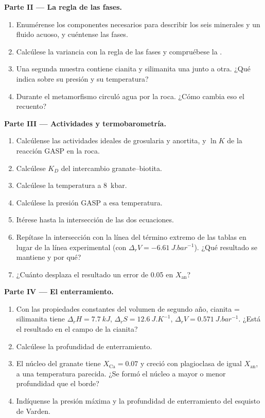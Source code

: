 \begin{problem}
\medskip\noindent\textbf{Parte II --- La regla de las fases.}
\begin{enumerate}[resume]
  \item Enumérense los componentes necesarios para describir los seis minerales y un
        fluido acuoso, y cuéntense las fases.
  \item Calcúlese la variancia con la regla de las fases y compruébese la
        .
  \item Una segunda muestra contiene cianita y silimanita una junto a otra. ¿Qué
        indica sobre su presión y su temperatura?
  \item Durante el metamorfismo circuló agua por la roca. ¿Cómo cambia eso
        el recuento?
\end{enumerate}

\medskip\noindent\textbf{Parte III --- Actividades y termobarometría.}
\begin{enumerate}[resume]
  \item Calcúlense las actividades ideales de grosularia y anortita, y $\ln K$
        de la reacción GASP en la roca.
  \item Calcúlese $K_D$ del intercambio granate--biotita.
  \item Calcúlese la temperatura a \qty{8}{kbar}.
  \item Calcúlese la presión GASP a esa temperatura.
  \item Itérese hasta la intersección de las dos ecuaciones.
  \item Repítase la intersección con la línea del término extremo de las tablas en lugar
        de la línea experimental (con $\Delta_rV = \qty{-6.61}{J.bar^{-1}}$).
        ¿Qué resultado se mantiene y por qué?
  \item ¿Cuánto desplaza el resultado un error de 0.05 en
        $X_{\text{an}}$?
\end{enumerate}

\medskip\noindent\textbf{Parte IV --- El enterramiento.}
\begin{enumerate}[resume]
  \item Con las propiedades constantes del volumen de segundo año, cianita =
        silimanita tiene $\Delta_rH = \qty{7.7}{kJ}$, $\Delta_rS =
        \qty{12.6}{J.K^{-1}}$, $\Delta_rV = \qty{0.571}{J.bar^{-1}}$. ¿Está el
        resultado en el campo de la cianita?
  \item Calcúlese la profundidad de enterramiento.
  \item El núcleo del granate tiene $X_{\text{Ca}} = 0.07$ y creció con plagioclasa
        de igual $X_{\text{an}}$, a una temperatura parecida. ¿Se formó el
        núcleo a mayor o menor profundidad que el borde?
  \item Indíquense la presión máxima y la profundidad de enterramiento del esquisto de Varden.
\end{enumerate}
\end{problem}
